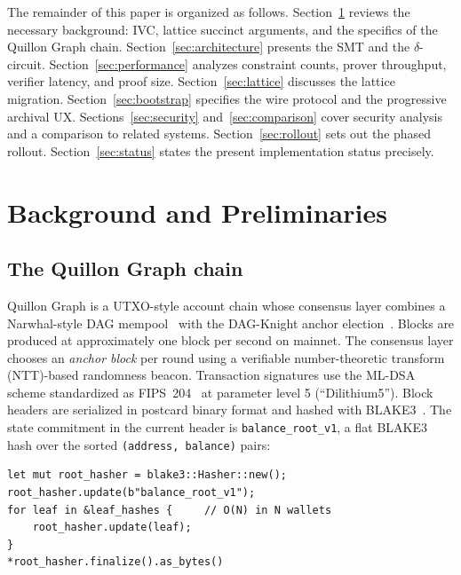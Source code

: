 \documentclass[11pt,a4paper]{article}
\begin{document}
The remainder of this paper is organized as follows. Section~\ref{sec:background}
reviews the necessary background: IVC, lattice succinct arguments, and the
specifics of the Quillon Graph chain. Section~\ref{sec:architecture} presents the
SMT and the $\delta$-circuit. Section~\ref{sec:performance} analyzes constraint
counts, prover throughput, verifier latency, and proof size.
Section~\ref{sec:lattice} discusses the lattice migration.
Section~\ref{sec:bootstrap} specifies the wire protocol and the progressive
archival UX. Sections~\ref{sec:security} and~\ref{sec:comparison} cover
security analysis and a comparison to related systems.
Section~\ref{sec:rollout} sets out the phased rollout.
Section~\ref{sec:status} states the present implementation status precisely.

\section{Background and Preliminaries}
\label{sec:background}

\subsection{The Quillon Graph chain}

Quillon Graph is a UTXO-style account chain whose consensus layer combines a
Narwhal-style DAG mempool~\cite{NarwhalTusk2022} with the
DAG-Knight anchor election~\cite{KaramanolakisDAGKnight2022}. Blocks are produced
at approximately one block per second on mainnet. The consensus layer chooses
an \emph{anchor block} per round using a verifiable number-theoretic transform
(NTT)-based randomness beacon. Transaction signatures use the ML-DSA scheme
standardized as FIPS~204~\cite{FIPS204} at parameter level 5 (``Dilithium5'').
Block headers are serialized in postcard
binary format and hashed with BLAKE3~\cite{BLAKE3spec}. The state commitment
in the current header is \texttt{balance\_root\_v1}, a flat BLAKE3 hash over the
sorted \texttt{(address, balance)} pairs:

\begin{lstlisting}[caption={Legacy state commitment in \texttt{crates/q-storage/src/lib.rs}.},label={lst:v1}]
let mut root_hasher = blake3::Hasher::new();
root_hasher.update(b"balance_root_v1");
for leaf in &leaf_hashes {     // O(N) in N wallets
    root_hasher.update(leaf);
}
*root_hasher.finalize().as_bytes()
\end{lstlisting}
\end{document}
